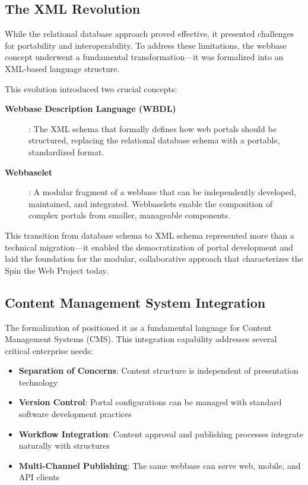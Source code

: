 \subsection{The XML Revolution}

While the relational database approach proved effective, it presented challenges for portability and interoperability. To address these limitations, the webbase concept underwent a fundamental transformation—it was formalized into an XML-based language structure.

This evolution introduced two crucial concepts:

\begin{description}
\item[\textbf{Webbase Description Language (WBDL)}]: The XML schema that formally defines how web portals should be structured, replacing the relational database schema with a portable, standardized format.

\item[\textbf{Webbaselet}]: A modular fragment of a webbase that can be independently developed, maintained, and integrated. Webbaselets enable the composition of complex portals from smaller, manageable components.
\end{description}

This transition from database schema to XML schema represented more than a technical migration—it enabled the democratization of portal development and laid the foundation for the modular, collaborative approach that characterizes the Spin the Web Project today.

\subsection{Content Management System Integration}

The formalization of \wbdl{} positioned it as a fundamental language for Content Management Systems (CMS). This integration capability addresses several critical enterprise needs:

\begin{itemize}
\item \textbf{Separation of Concerns}: Content structure is independent of presentation technology
\item \textbf{Version Control}: Portal configurations can be managed with standard software development practices
\item \textbf{Workflow Integration}: Content approval and publishing processes integrate naturally with \wbdl{} structures
\item \textbf{Multi-Channel Publishing}: The same webbase can serve web, mobile, and API clients
\end{itemize}

